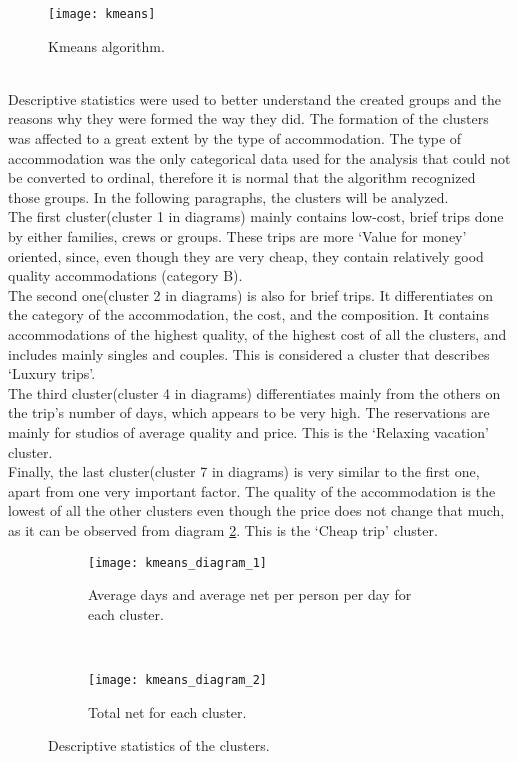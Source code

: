 \begin{figure}[ht]
\centering
\texttt{[image: kmeans]}
\caption{Kmeans algorithm.}
\label{fig:kmeans}
\end{figure}
\\
Descriptive statistics were used to better understand the created groups and the reasons why they were formed the way they did. The formation of the clusters was affected to a great extent by the type of accommodation. The type of accommodation was the only categorical data used for the analysis that could not be converted to ordinal, therefore it is normal that the algorithm recognized those groups. In the following paragraphs, the clusters will be analyzed. \\
The first cluster(cluster 1 in diagrams) mainly contains low-cost, brief trips done by either families, crews or groups. These trips are more `Value for money' oriented, since, even though they are very cheap, they contain relatively good quality accommodations (category B). \\
The second one(cluster 2 in diagrams) is also for brief trips. It differentiates on the category of the accommodation, the cost, and the composition. It contains accommodations of the highest quality, of the highest cost of all the clusters, and includes mainly singles and couples. This is considered a cluster that describes `Luxury trips'. \\
The third cluster(cluster 4 in diagrams) differentiates mainly from the others on the trip's number of days, which appears to be very high. The reservations are mainly for studios of average quality and price. This is the `Relaxing vacation' cluster. \\
Finally, the last cluster(cluster 7 in diagrams) is very similar to the first one, apart from one very important factor. The quality of the accommodation is the lowest of all the other clusters even though the price does not change that much, as it can be observed from diagram \ref{fig:kmeans1}. This is the `Cheap trip' cluster.
\begin{figure}[ht]
\centering
\begin{subfigure}{.8\textwidth}
\centering
\texttt{[image: kmeans\_diagram\_1]}
\caption{Average days and average net per person per day for each cluster.}
\label{fig:kmeans1}
\end{subfigure}%
\\
\begin{subfigure}{.8\textwidth}
\centering
\texttt{[image: kmeans\_diagram\_2]}
\caption{Total net for each cluster.}
\label{fig:kmeans2}
\end{subfigure}%
\caption{Descriptive statistics of the clusters.}
\label{fig:kmeans_descriptives}
\end{figure}
